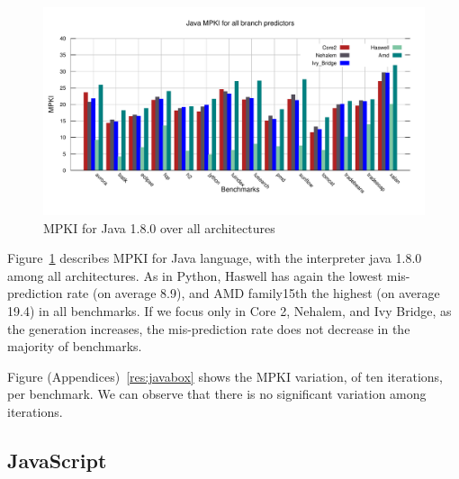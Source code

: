 \documentclass[parskip=full, paper=a4, fontsize=12pt]{scrartcl}
\numberwithin{equation}{section}
\numberwithin{figure}{section}
\numberwithin{table}{section}
\begin{document}
\begin{figure}[t]
	\centering
	\includegraphics[width=1\textwidth]{figures/java_MPKI.pdf}
	\caption{MPKI for Java 1.8.0 over all architectures}
	\label{fig:javampki}
\end{figure}

Figure~\ref{fig:javampki} describes MPKI for Java language, with the interpreter java 1.8.0 among all architectures. As in Python, Haswell has again the lowest mis-prediction rate (on average 8.9), and AMD family15th the highest (on average 19.4) in all benchmarks. If we focus only in Core 2, Nehalem, and Ivy Bridge, as the generation increases, the mis-prediction rate does not decrease in the majority of benchmarks. 

Figure (Appendices)~\ref{res:javabox} shows the MPKI variation, of ten iterations, per benchmark. We can observe that there is no significant variation among iterations.

\subsection{JavaScript}
\end{document}
